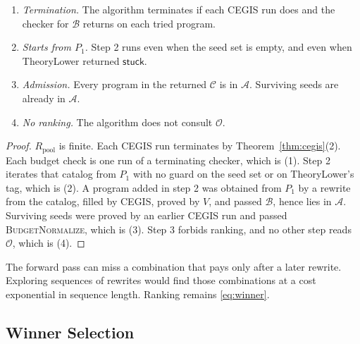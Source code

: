 \begin{lemma}
\label{lem:generatepool}
\begin{enumerate}
  \item \emph{Termination.} The algorithm terminates if each CEGIS run
  does and the checker for \(\mathcal{B}\) returns on each tried program.
  \item \emph{Starts from \(P_1\).} Step 2 runs even when the seed set is
  empty, and even when TheoryLower returned \(\mathsf{stuck}\).
  \item \emph{Admission.} Every program in the returned \(\mathcal{C}\)
  is in \(\mathcal{A}\). Surviving seeds are already in \(\mathcal{A}\).
  \item \emph{No ranking.} The algorithm does not consult
  \(\mathcal{O}\).
\end{enumerate}
\end{lemma}
\begin{proof}
\(R_{\mathrm{pool}}\) is finite. Each CEGIS run terminates by
Theorem~\ref{thm:cegis}(2). Each budget check is one run of a terminating
checker, which is (1). Step 2
iterates that catalog from \(P_1\) with no guard on the seed set or on
TheoryLower's tag, which is (2). A program added in step 2 was obtained
from \(P_1\) by a rewrite from the catalog, filled by CEGIS, proved by
\(V\), and passed \(\mathcal{B}\), hence lies in \(\mathcal{A}\). Surviving
seeds were proved by an earlier CEGIS run and passed
\textsc{BudgetNormalize}, which is (3). Step 3 forbids ranking, and no
other step reads \(\mathcal{O}\), which is (4).
\end{proof}

The forward pass can miss a combination that pays only after a later
rewrite. Exploring sequences of rewrites would find those combinations at
a cost exponential in sequence length. Ranking remains
\eqref{eq:winner}.

\subsection{Winner Selection}

